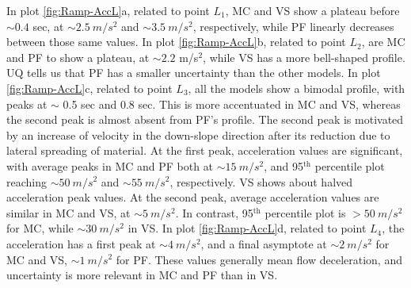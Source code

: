 \documentclass{article}
\begin{document}
In plot \ref{fig:Ramp-AccL}a, related to point $L_1$, MC and VS show a plateau before $\sim 0.4$ sec, at $\sim 2.5 \ m/s^2$ and $\sim 3.5 \ m/s^2$, respectively, while PF linearly decreases between those same values. In plot \ref{fig:Ramp-AccL}b, related to point $L_2$, are MC and PF to show a plateau, at $\sim 2.2$ m/s$^2$, while VS has a more bell-shaped profile. UQ tells us that PF has a smaller uncertainty than the other models. In plot \ref{fig:Ramp-AccL}c, related to point $L_3$, all the models show a bimodal profile, with peaks at $\sim$ 0.5 sec and 0.8 sec. This is more accentuated in MC and VS, whereas the second peak is almost absent from PF's profile. The second peak is motivated by an increase of velocity in the down-slope direction after its reduction due to lateral spreading of material. At the first peak, acceleration values are significant, with average peaks in MC and PF both at $\sim 15 \ m/s^2$, and 95$^{\mathrm{th}}$ percentile plot reaching $\sim 50 \ m/s^2$ and $\sim 55 \ m/s^2$, respectively. VS shows about halved acceleration peak values. At the second peak, average acceleration values are similar in MC and VS, at $\sim 5 \ m/s^2$. In contrast, 95$^{\mathrm{th}}$ percentile plot is $> 50 \ m/s^2$ for MC, while $\sim 30 \ m/s^2$ in VS. In plot \ref{fig:Ramp-AccL}d, related to point $L_4$, the acceleration has a first peak at $\sim 4 \ m/s^2$, and a final asymptote at $\sim 2 \ m/s^2$ for MC and VS, $\sim 1 \ m/s^2$ for PF. These values generally mean flow deceleration, and uncertainty is more relevant in MC and PF than in VS.
\end{document}
